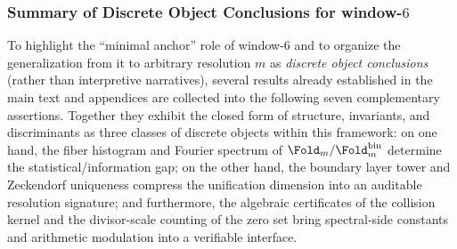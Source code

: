 \subsubsection{Summary of Discrete Object Conclusions for window-\texorpdfstring{\(6\)}{6}}\label{subsubsec:window6-discrete-results}
To highlight the ``minimal anchor'' role of window-\(6\) and to organize the generalization from it to arbitrary resolution \(m\) as \emph{discrete object conclusions} (rather than interpretive narratives), several results already established in the main text and appendices are collected into the following seven complementary assertions.
Together they exhibit the closed form of structure, invariants, and discriminants as three classes of discrete objects within this framework: on one hand, the fiber histogram and Fourier spectrum of \(\Fold_m/\Fold^{\mathrm{bin}}_m\) determine the statistical/information gap; on the other hand, the boundary layer tower and Zeckendorf uniqueness compress the unification dimension into an auditable resolution signature; and furthermore, the algebraic certificates of the collision kernel and the divisor-scale counting of the zero set bring spectral-side constants and arithmetic modulation into a verifiable interface.

